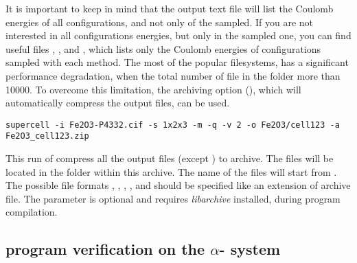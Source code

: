 \documentclass[a4paper,10pt]{article}
\begin{document}
It is important to keep in mind that the output text file  will list the Coulomb energies of all configurations, and not only of the sampled. If you are not interested in all configurations energies, but only in the sampled one, you can find useful files , , and , which lists only the Coulomb energies of configurations sampled with each method. The most of the popular filesystems, has a significant performance degradation, when the total number of file in the folder more than \num{10000}. To overcome this limitation, the archiving option (), which will automatically compress the output files, can be used.
\begin{Verbatim}[breaklines]
  supercell -i Fe2O3-P4332.cif -s 1x2x3 -m -q -v 2 -o Fe2O3/cell123 -a Fe2O3_cell123.zip
\end{Verbatim}
This run of \sups{} compress all the output files (except ) to  archive. The files will be located in the folder  within this archive. The name of the files will start from . The possible file formats , , , ,  and  should be specified like an extension of archive file. The parameter is optional and requires \textit{libarchive} installed, during program compilation.


\subsection*{\Sups{} program verification on the $\alpha$- system}
\end{document}
